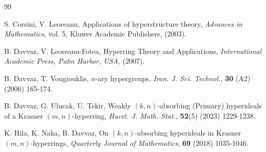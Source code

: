 \documentclass[preprint,review,10pt]{amsart}
\theoremstyle{definition}
\theoremstyle{remark}
\numberwithin{equation}{section}
\begin{document}
\begin{thebibliography}{99}







S. Corsini, V. Leoreanu, Applications of hyperstructure theory, {\it Advances in Mathematics}, vol. 5, Kluwer Academic Publishers, (2003). 

B. Davvaz, V. Leoreanu-Fotea, Hyperring Theory and Applications, {\it International Academic Press, Palm Harbor, USA}, (2007).


B. Davvaz, T. Vougiouklis, $n$-ary hypergroups, {\it Iran. J. Sci. Technol.,} {\bf 30} (A2) (2006) 165-174. 

B. Davvaz, G. Ulucak, U. Tekir, Weakly $(k, n)$-absorbing (Primary) hyperideals of a Krasner $(m,n)$-hyperring, {\it Hacet. J. Math. Stat.,} {\bf 52}(5) (2023) 1229-1238.







K. Hila, K. Naka, B. Davvaz, On $(k,n)$-absorbing
hyperideals in Krasner $(m,n)$-hyperrings, {\it Quarterly Journal of
Mathematics}, {\bf 69}
(2018) 1035-1046.


\end{thebibliography}
\end{document}

